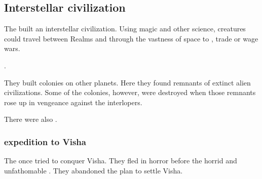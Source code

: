 \subsection{Interstellar civilization}
The \ophidians built an interstellar civilization. 
Using magic and other science, creatures could travel between Realms and through the vastness of space to \cooperate, trade or wage wars. 

\Sethicus {}. 

They built colonies on other planets. 
Here they found remnants of extinct alien civilizations.
Some of the colonies, however, were destroyed when those remnants rose up in vengeance against the \Miithian interlopers.

There were also . 





\subsubsection{\Ophidian expedition to Visha}
The \ophidians once tried to conquer Visha.
They fled in horror before the horrid and unfathomable \moongods. 
They abandoned the plan to settle Visha. 












